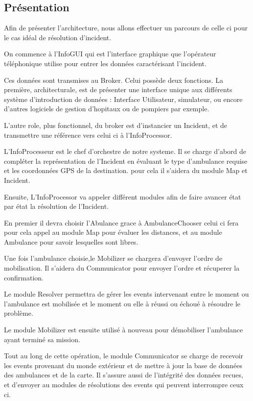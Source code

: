 \subsection{Présentation}
	Afin de présenter l'architecture, nous allons effectuer
	un parcours de celle ci pour le cas idéal de résolution
	d'incident.

	On commence à l'InfoGUI qui est l'interface graphique que
	l'opérateur téléphonique utilise pour entrer les données
	caractérisant l'incident.

	Ces données sont transmises au Broker. Celui possède deux
	fonctions. La première, architecturale, est de présenter
	une interface unique aux différents système d'introduction
	de données : Interface Utilisateur, simulateur, ou encore 
	d'autres logiciels de gestion d'hopitaux ou de pompiers par
	exemple.
	
	L'autre role, plus fonctionnel, du broker est d'instancier
	un Incident, et de transmettre
	une référence vers celui ci à l'InfoProcessor.

	L'InfoProcesseur est le chef d'orchestre de notre systeme.
	Il se charge d'abord de compléter la représentation de
	l'Incident en évaluant le type d'ambulance requise
	et les coordonnées GPS de la destination. pour cela
	il s'aidera du module Map et Incident.

	Ensuite, L'InfoProcessor va appeler différent modules
	afin de faire avancer état par état la résolution de
	l'Incident. 

	En premier il devra choisir l'Abulance grace à AmbulanceChooser
	celui ci fera pour cela appel au module Map pour
	évaluer les distances, et au module Ambulance pour savoir
	lesquelles sont libres. 

	Une fois l'ambulance choisie,le Mobilizer se chargera d'envoyer
	l'ordre de mobilisation. Il s'aidera du Communicator pour 
	envoyer l'ordre et récuperer la confirmation. 

	Le module Resolver permettra de gérer les events intervenant
	entre le moment ou l'ambulance est mobilisée et le moment
	ou elle à réussi ou échoué à résoudre le problème.

	Le module Mobilizer est ensuite utilisé à nouveau pour démobiliser
	l'ambulance ayant terminé sa mission. 

	Tout au long de cette opération, le module Communicator se
	charge de recevoir les events provenant du monde extérieur
	et de mettre à jour la base de données des ambulances et de
	la carte. Il s'assure aussi de l'intégrité des données recues,
	et d'envoyer au modules de résolutions des events qui 
	peuvent interrompre ceux ci.


